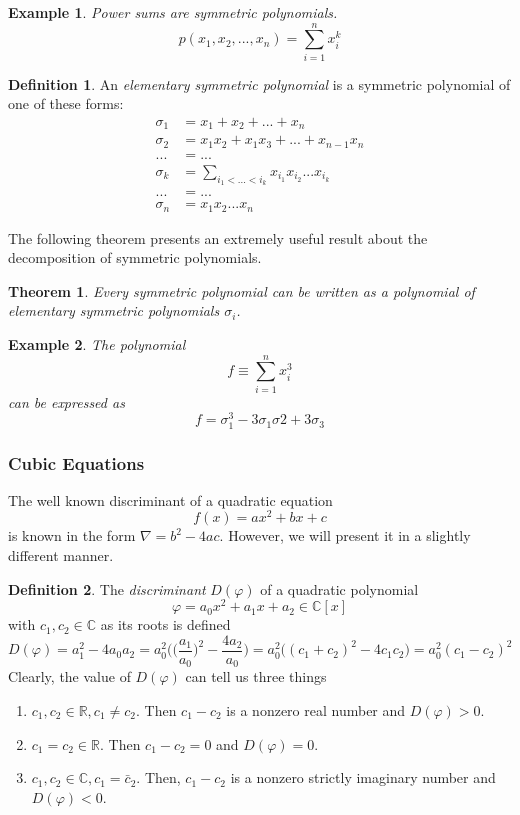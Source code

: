 \documentclass{article}
\newtheorem{theorem}{Theorem}[section]
\newtheorem{example}{Example}[section]
\theoremstyle{remark}
\theoremstyle{definition}
\newtheorem{definition}{Definition}[section]
\begin{document}
\begin{example}
Power sums are symmetric polynomials. 
\[p(x_1, x_2, ..., x_n) = \sum_{i=1}^n x_i^k\]
\end{example}

\begin{definition}
An \textit{elementary symmetric polynomial} is a symmetric polynomial of one of these forms: 
\begin{align*}
    \sigma_1 & = x_1 + x_2 + ... + x_n \\
    \sigma_2 & = x_1 x_2 + x_1 x_3 + ... + x_{n-1} x_n \\
    ... & = ... \\
    \sigma_k & = \sum_{i_1 < ... < i_k} x_{i_1} x_{i_2} ... x_{i_k} \\
    ... & = ... \\
    \sigma_n & = x_1 x_2 ... x_n
\end{align*}
\end{definition}

The following theorem presents an extremely useful result about the decomposition of symmetric polynomials. 

\begin{theorem}
Every symmetric polynomial can be written as a polynomial of elementary symmetric polynomials $\sigma_i$. 
\end{theorem}

\begin{example}
The polynomial 
\[f \equiv \sum_{i=1}^n x_i^3\]
can be expressed as 
\[f = \sigma_1^3 - 3 \sigma_1 \sigma 2 + 3 \sigma_3\]
\end{example}

\subsubsection{Cubic Equations}
The well known discriminant of a quadratic equation 
\[f(x) = ax^2 + bx + c\]
is known in the form $\nabla = b^2 - 4ac$. However, we will present it in a slightly different manner. 

\begin{definition}
The \textit{discriminant} $D(\varphi)$ of a quadratic polynomial
\[\varphi = a_0 x^2 + a_1 x + a_2 \in \mathbb{C}[x]\]
with $c_1, c_2 \in \mathbb{C}$ as its roots is defined
\[D(\varphi) = a_1^2 - 4 a_0 a_2 = a_0^2 \bigg( \Big(\frac{a_1}{a_0} \Big)^2 - \frac{4 a_2}{a_0} \bigg) = a_0^2 \big( (c_1 + c_2)^2 - 4 c_1 c_2 \big) = a_0^2 (c_1 - c_2)^2\]
Clearly, the value of $D(\varphi)$ can tell us three things
\begin{enumerate}
    \item $c_1, c_2 \in \mathbb{R}, c_1 \neq c_2$. Then $c_1 - c_2$ is a nonzero real number and $D(\varphi) > 0$. 
    \item $c_1 = c_2 \in \mathbb{R}$. Then $c_1 - c_2 = 0$ and $D(\varphi) = 0$. 
    \item $c_1, c_2 \in \mathbb{C}, c_1 = \bar{c}_2$. Then, $c_1 - c_2$ is a nonzero strictly imaginary number and $D(\varphi) < 0$. 
\end{enumerate}
\end{definition}
\end{document}
